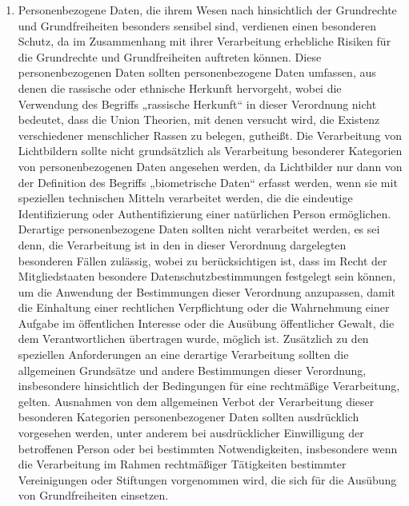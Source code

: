 \begin{enumerate}
   \item Personenbezogene Daten, die ihrem Wesen nach hinsichtlich der Grundrechte und Grundfreiheiten besonders
    sensibel sind, verdienen einen besonderen Schutz, da im Zusammenhang mit ihrer Verarbeitung erhebliche Risiken für
    die Grundrechte und Grundfreiheiten auftreten können. Diese personenbezogenen Daten sollten personenbezogene Daten
    umfassen, aus denen die rassische oder ethnische Herkunft hervorgeht, wobei die Verwendung des Begriffs „rassische
    Herkunft“ in dieser Verordnung nicht bedeutet, dass die Union Theorien, mit denen versucht wird, die Existenz
    verschiedener menschlicher Rassen zu belegen, gutheißt. Die Verarbeitung von Lichtbildern sollte nicht
    grundsätzlich als Verarbeitung besonderer Kategorien von personenbezogenen Daten angesehen werden, da Lichtbilder
    nur dann von der Definition des Begriffs „biometrische Daten“ erfasst werden, wenn sie mit speziellen technischen
    Mitteln verarbeitet werden, die die eindeutige Identifizierung oder Authentifizierung einer natürlichen Person
    ermöglichen. Derartige personenbezogene Daten sollten nicht verarbeitet werden, es sei denn, die Verarbeitung ist
    in den in dieser Verordnung dargelegten besonderen Fällen zulässig, wobei zu berücksichtigen ist, dass im Recht der
    Mitgliedstaaten besondere Datenschutzbestimmungen festgelegt sein können, um die Anwendung der Bestimmungen dieser
    Verordnung anzupassen, damit die Einhaltung einer rechtlichen Verpflichtung oder die Wahrnehmung einer Aufgabe im
    öffentlichen Interesse oder die Ausübung öffentlicher Gewalt, die dem Verantwortlichen übertragen wurde, möglich
    ist. Zusätzlich zu den speziellen Anforderungen an eine derartige Verarbeitung sollten die allgemeinen Grundsätze
    und andere Bestimmungen dieser Verordnung, insbesondere hinsichtlich der Bedingungen für eine rechtmäßige
    Verarbeitung, gelten. Ausnahmen von dem allgemeinen Verbot der Verarbeitung dieser besonderen Kategorien
    personenbezogener Daten sollten ausdrücklich vorgesehen werden, unter anderem bei ausdrücklicher Einwilligung der
    betroffenen Person oder bei bestimmten Notwendigkeiten, insbesondere wenn die Verarbeitung im Rahmen rechtmäßiger
    Tätigkeiten bestimmter Vereinigungen oder Stiftungen vorgenommen wird, die sich für die Ausübung von
    Grundfreiheiten einsetzen.%
   \label{itm:eg-51}
   


\end{enumerate}

